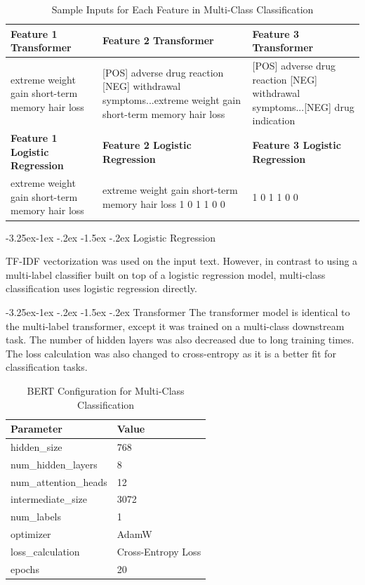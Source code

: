 \documentclass[10.7pt, onecolumn]{article}
\makeatletter
\renewcommand\subsubsection{\@startsection{subsubsection}{3}{\z@}%
	{-3.25ex\@plus -1ex \@minus -.2ex}%
    {-1.5ex \@plus -.2ex}%
    {\normalfont\itshape}}
\makeatother
\begin{document}
\begin{table}[H]
  \centering
  \small
  \begin{tabular}{|p{5cm}|p{5cm}|p{5cm}|}
    \hline
    \textbf{Feature 1 Transformer} & \textbf{Feature 2 Transformer} & \textbf{Feature 3 Transformer} \\
    \hline
    extreme weight gain short-term memory hair loss & [POS] adverse drug reaction [NEG] withdrawal symptoms...extreme weight gain short-term memory hair loss &[POS] adverse drug reaction [NEG] withdrawal symptoms...[NEG] drug indication\\
    \hline
    \textbf{Feature 1 Logistic Regression} & \textbf{Feature 2 Logistic Regression} & \textbf{Feature 3 Logistic Regression} \\
    \hline
    extreme weight gain short-term memory hair loss & extreme weight gain short-term memory hair loss 1 0 1 1 0 0 & 1 0 1 1 0 0\\
    \hline
  \end{tabular}
  \caption{Sample Inputs for Each Feature in Multi-Class Classification}
  \label{tab:multiclassInput}
\end{table}

\subsubsection{Logistic Regression}

TF-IDF vectorization was used on the input text. However, in contrast to using a multi-label classifier built on top of a logistic regression model, multi-class classification uses logistic regression directly.

\subsubsection{Transformer}
The transformer model is identical to the multi-label transformer, except it was trained on a multi-class downstream task. The number of hidden layers was also decreased due to long training times. The loss calculation was also changed to cross-entropy as it is a better fit for classification tasks\cite{hui2021evaluation}.

\begin{table}[H]
  \centering
  \small
  \begin{tabular}{|p{4cm}|p{3cm}|}
    \hline
    \textbf{Parameter} & \textbf{Value} \\
    \hline
    hidden\_size & 768 \\
    \hline
    num\_hidden\_layers & 8 \\
    \hline
    num\_attention\_heads & 12 \\
    \hline
    intermediate\_size & 3072 \\
    \hline
    num\_labels & 1 \\
    \hline
    optimizer & AdamW \\
    \hline
    loss\_calculation & Cross-Entropy Loss \\
    \hline
    epochs & 20 \\
    \hline
  \end{tabular}
  \caption{BERT Configuration for Multi-Class Classification}
  \label{tab:task2Parameters}
\end{table}
\end{document}
